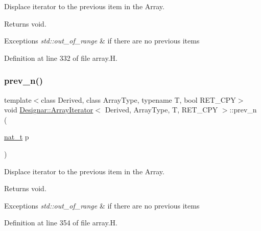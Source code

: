 Displace iterator to the previous item in the Array. 

\begin{DoxyReturn}{Returns}
void. 
\end{DoxyReturn}

\begin{DoxyExceptions}{Exceptions}
{\em std\+::out\+\_\+of\+\_\+range} & if there are no previous items \\
\hline
\end{DoxyExceptions}


Definition at line 332 of file array.\+H.

\mbox{\label{class_designar_1_1_array_iterator_a5a417cab0b0b039c69d5a52a513a019f}} 
\subsubsection{\texorpdfstring{prev\+\_\+n()}{prev\_n()}}
{\footnotesize\ttfamily template$<$class Derived, class Array\+Type, typename T, bool R\+E\+T\+\_\+\+C\+PY$>$ \\
void \hyperlink{class_designar_1_1_array_iterator}{Designar\+::\+Array\+Iterator}$<$ Derived, Array\+Type, T, R\+E\+T\+\_\+\+C\+PY $>$\+::prev\+\_\+n (\begin{DoxyParamCaption}\item[{\hyperlink{namespace_designar_aa72662848b9f4815e7bf31a7cf3e33d1}{nat\+\_\+t}}]{p }\end{DoxyParamCaption})\hspace{0.3cm}{\ttfamily [inline]}}



Displace iterator to the previous item in the Array. 

\begin{DoxyReturn}{Returns}
void. 
\end{DoxyReturn}

\begin{DoxyExceptions}{Exceptions}
{\em std\+::out\+\_\+of\+\_\+range} & if there are no previous items \\
\hline
\end{DoxyExceptions}


Definition at line 354 of file array.\+H.

\mbox{\label{class_designar_1_1_array_iterator_af8781369a1cb13f92c8c2dbab9975118}} 
